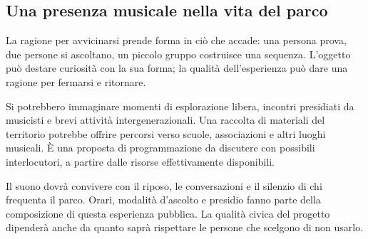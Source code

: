 \subsection{Una presenza musicale nella vita del parco}
La ragione per avvicinarsi prende forma in ciò che accade:
una persona prova, due persone si ascoltano, un piccolo
gruppo costruisce una sequenza. L'oggetto può destare
curiosità con la sua forma; la qualità dell'esperienza
può dare una ragione per fermarsi e ritornare.

Si potrebbero immaginare momenti di esplorazione libera,
incontri presidiati da musicisti e brevi attività
intergenerazionali. Una raccolta di materiali del
territorio potrebbe offrire percorsi verso scuole,
associazioni e altri luoghi musicali. È una proposta
di programmazione da discutere con possibili interlocutori,
a partire dalle risorse effettivamente disponibili.

Il suono dovrà convivere con il riposo, le conversazioni
e il silenzio di chi frequenta il parco. Orari, modalità
d'ascolto e presidio fanno parte della composizione
di questa esperienza pubblica. La qualità civica del
progetto dipenderà anche da quanto saprà rispettare
le persone che scelgono di non usarlo.

